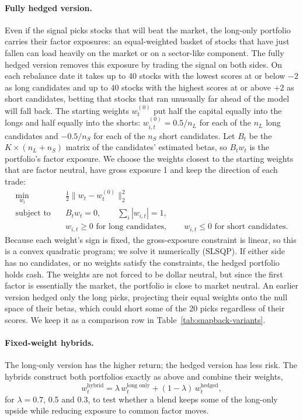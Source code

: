 \documentclass[11pt]{article}
\begin{document}
\paragraph{Fully hedged version.} Even if the signal picks stocks that will beat the market, the long-only portfolio carries their factor exposures: an equal-weighted basket of stocks that have just fallen can load heavily on the market or on a sector-like component. The fully hedged version removes this exposure by trading the signal on both sides. On each rebalance date it takes up to 40 stocks with the lowest scores at or below $-2$ as long candidates and up to 40 stocks with the highest scores at or above $+2$ as short candidates, betting that stocks that ran unusually far ahead of the model will fall back. The starting weights $w^{(0)}_t$ put half the capital equally into the longs and half equally into the shorts: $w^{(0)}_{i,t} = 0.5 / n_L$ for each of the $n_L$ long candidates and $-0.5 / n_S$ for each of the $n_S$ short candidates. Let $B_t$ be the $K \times (n_L + n_S)$ matrix of the candidates' estimated betas, so $B_t w_t$ is the portfolio's factor exposure. We choose the weights closest to the starting weights that are factor neutral, have gross exposure 1 and keep the direction of each trade:
\[
\begin{aligned}
\min_{w_t} \quad & \tfrac{1}{2} \lVert w_t - w^{(0)}_t \rVert_2^2 \\
\text{subject to} \quad & B_t w_t = 0, \qquad \textstyle\sum_i |w_{i,t}| = 1, \\
& w_{i,t} \ge 0 \text{ for long candidates}, \qquad w_{i,t} \le 0 \text{ for short candidates}.
\end{aligned}
\]
Because each weight's sign is fixed, the gross-exposure constraint is linear, so this is a convex quadratic program; we solve it numerically (SLSQP). If either side has no candidates, or no weights satisfy the constraints, the hedged portfolio holds cash. The weights are not forced to be dollar neutral, but since the first factor is essentially the market, the portfolio is close to market neutral. An earlier version hedged only the long picks, projecting their equal weights onto the null space of their betas, which could short some of the 20 picks regardless of their scores. We keep it as a comparison row in Table~\ref{tab:snapback-variants}.

\paragraph{Fixed-weight hybrids.} The long-only version has the higher return; the hedged version has less risk. The hybrids construct both portfolios exactly as above and combine their weights,
\[
    w_t^{\text{hybrid}} = \lambda\, w_t^{\text{long only}} + (1 - \lambda)\, w_t^{\text{hedged}},
\]
for $\lambda = 0.7$, 0.5 and 0.3, to test whether a blend keeps some of the long-only upside while reducing exposure to common factor moves.
\end{document}
